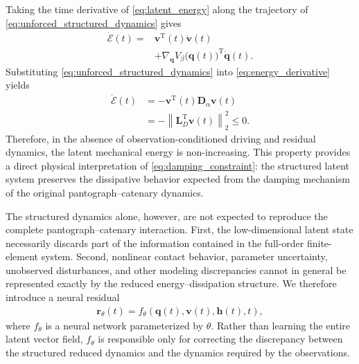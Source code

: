 \documentclass[journal,twoside]{IEEEtran}
\begin{document}
Taking the time derivative of \eqref{eq:latent_energy} along the trajectory
of \eqref{eq:unforced_structured_dynamics} gives
\begin{equation}
\begin{aligned}
    \dot{\mathcal{E}}(t)
    ={}&
    \mathbf{v}^{\mathrm T}(t)
    \dot{\mathbf{v}}(t) \\
    &+
    \nabla_{\mathbf q}V_{\beta}
    \big(\mathbf q(t)\big)^{\mathrm T}
    \dot{\mathbf q}(t).
\end{aligned}
\label{eq:energy_derivative}
\end{equation}
Substituting \eqref{eq:unforced_structured_dynamics} into
\eqref{eq:energy_derivative} yields
\begin{equation}
\begin{aligned}
    \dot{\mathcal{E}}(t)
    &=
    -\mathbf{v}^{\mathrm T}(t)
    \mathbf{D}_{\alpha}
    \mathbf{v}(t)\\
    &=
    -\left\|
    \mathbf{L}_{D}^{\mathrm T}
    \mathbf{v}(t)
    \right\|_2^2
    \leq 0.
\end{aligned}
\label{eq:energy_dissipation}
\end{equation}
Therefore, in the absence of observation-conditioned driving and residual
dynamics, the latent mechanical energy is non-increasing. This property
provides a direct physical interpretation of
\eqref{eq:damping_constraint}: the structured latent system preserves the
dissipative behavior expected from the damping mechanism of the original
pantograph--catenary dynamics.

The structured dynamics alone, however, are not expected to reproduce the
complete pantograph--catenary interaction. First, the low-dimensional latent
state necessarily discards part of the information contained in the
full-order finite-element system. Second, nonlinear contact behavior,
parameter uncertainty, unobserved disturbances, and other modeling
discrepancies cannot in general be represented exactly by the reduced
energy--dissipation structure. We therefore introduce a neural residual
\begin{equation}
\begin{aligned}
    \mathbf{r}_{\theta}(t)
    =
    f_{\theta}
    \left(
        \mathbf{q}(t),
        \mathbf{v}(t),
        \mathbf{h}(t),
        t
    \right),
\end{aligned}
\label{eq:neural_residual}
\end{equation}
where $f_{\theta}$ is a neural network parameterized by $\theta$. Rather than
learning the entire latent vector field, $f_{\theta}$ is responsible only for
correcting the discrepancy between the structured reduced dynamics and the
dynamics required by the observations.
\end{document}
